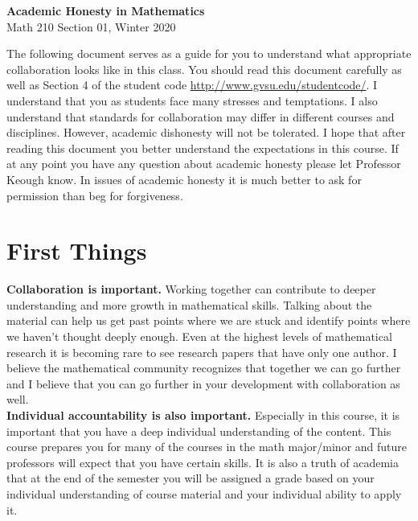 \documentclass[12pt]{article}
\begin{document}
\vspace{-1.2in}
\begin{center} \textbf{\Large{Academic Honesty in Mathematics}} \\
Math 210 Section 01, Winter 2020
\end{center}

\noindent The following document serves as a guide for you to understand what appropriate collaboration looks like in this class.  You should read this document carefully as well as Section 4 of the student code \url{http://www.gvsu.edu/studentcode/}.  I understand that you as students face many stresses and temptations.  I also understand that standards for collaboration may differ in different courses and disciplines. However, academic dishonesty will not be tolerated. I hope that after reading this document you better understand the expectations in this course. If at any point you have any question about academic honesty please let Professor Keough know.  In issues of academic honesty it is much better to ask for permission than beg for forgiveness. 

\vspace{-.2in}
\section*{First Things}

\textbf{Collaboration is important.}  Working together can contribute to deeper understanding and more growth in mathematical skills.  Talking about the material can help us get past points where we are stuck and identify points where we haven't thought deeply enough.  Even at the highest levels of mathematical research it is becoming rare to see research papers that have only one author.  I believe the mathematical community recognizes that together we can go further and I believe that you can go further in your development with collaboration as well. \\

\noindent\textbf{Individual accountability is also important.}  Especially in this course, it is important that you have a deep individual understanding of the content.  This course prepares you for many of the courses in the math major/minor and future professors will expect that you have certain skills.  It is also a truth of academia that at the end of the semester you will be assigned a grade based on your individual understanding of course material and your individual ability to apply it. \\
\end{document}
